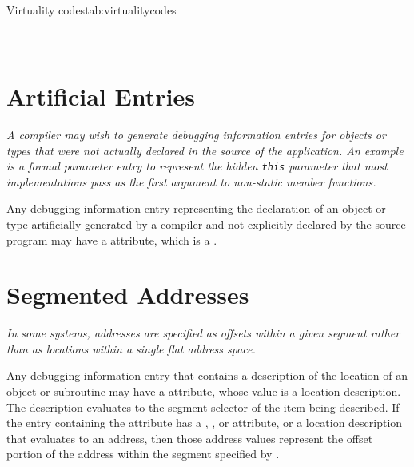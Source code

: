 \begin{simplenametable}[2.5in]{Virtuality codes}{tab:virtualitycodes}
\DWVIRTUALITYnoneTARG{}                      \\
\DWVIRTUALITYvirtualTARG{}                \\
\DWVIRTUALITYpurevirtualTARG{}    \\
\end{simplenametable}

\section{Artificial Entries}
\label{chap:artificialentries}
\textit{A compiler may wish to generate debugging information entries
for objects or types that were not actually declared in the
source of the application. An example is a formal parameter
entry to represent the hidden 
\texttt{this} parameter
that most  implementations pass as the first argument 
to non-static member functions.}  

Any debugging information entry representing the
declaration of an object or type artificially generated by
a compiler and not explicitly declared by the source 
program\hypertarget{chap:DWATartificialobjectsortypesthat}{}
may have a 
\DWATartificialDEFN{} attribute, 
which is a .

\section{Segmented Addresses}
\label{chap:segmentedaddresses}
\textit{In some systems, addresses are specified as offsets within a
given 
segment 
rather than as locations within a single flat
address space.}

Any debugging information entry that contains a description
of\hypertarget{chap:DWATsegmentaddressinginformation}{}
the location of an object or subroutine may have a 
\DWATsegmentDEFN{} attribute, 
whose value is a location
description. The description evaluates to the segment selector
of the item being described. If the entry containing the
\DWATsegmentNAME{} attribute has a 
\DWATlowpc, 
\DWAThighpc,
\DWATranges{} or 
\DWATentrypc{} attribute, 
or 
a location
description that evaluates to an address, then those address
values represent the offset portion of the address within
the segment specified 
by \DWATsegmentNAME.

